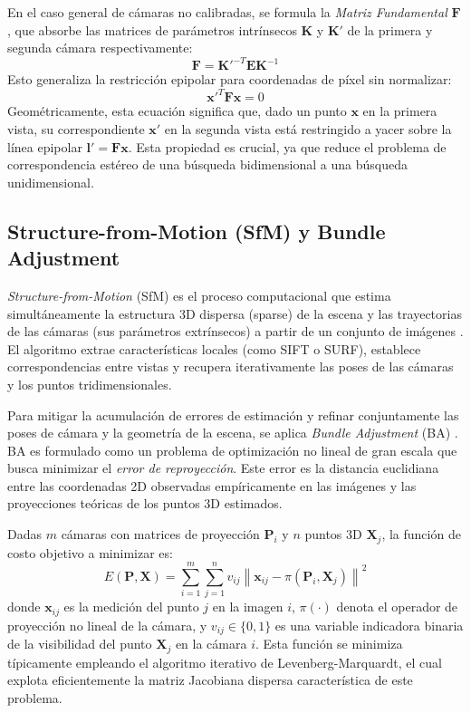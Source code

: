 En el caso general de cámaras no calibradas, se formula la \textit{Matriz Fundamental} $\mathbf{F}$, que absorbe las matrices de parámetros intrínsecos $\mathbf{K}$ y $\mathbf{K}'$ de la primera y segunda cámara respectivamente:
\begin{equation}
    \mathbf{F} = \mathbf{K}'^{-T} \mathbf{E} \mathbf{K}^{-1}
\end{equation}
Esto generaliza la restricción epipolar para coordenadas de píxel sin normalizar:
\begin{equation}
    \mathbf{x}'^T \mathbf{F} \mathbf{x} = 0
\end{equation}
Geométricamente, esta ecuación significa que, dado un punto $\mathbf{x}$ en la primera vista, su correspondiente $\mathbf{x}'$ en la segunda vista está restringido a yacer sobre la línea epipolar $\mathbf{l}' = \mathbf{F}\mathbf{x}$. Esta propiedad es crucial, ya que reduce el problema de correspondencia estéreo de una búsqueda bidimensional a una búsqueda unidimensional.

\subsection{Structure-from-Motion (SfM) y Bundle Adjustment}

\textit{Structure-from-Motion} (SfM) es el proceso computacional que estima simultáneamente la estructura 3D dispersa (sparse) de la escena y las trayectorias de las cámaras (sus parámetros extrínsecos) a partir de un conjunto de imágenes \cite{schonberger2016structure}. El algoritmo extrae características locales (como SIFT o SURF), establece correspondencias entre vistas y recupera iterativamente las poses de las cámaras y los puntos tridimensionales.

Para mitigar la acumulación de errores de estimación y refinar conjuntamente las poses de cámara y la geometría de la escena, se aplica \textit{Bundle Adjustment} (BA) \cite{triggs1999bundle}. BA es formulado como un problema de optimización no lineal de gran escala que busca minimizar el \textit{error de reproyección}. Este error es la distancia euclidiana entre las coordenadas 2D observadas empíricamente en las imágenes y las proyecciones teóricas de los puntos 3D estimados.

Dadas $m$ cámaras con matrices de proyección $\mathbf{P}_i$ y $n$ puntos 3D $\mathbf{X}_j$, la función de costo objetivo a minimizar es:
\begin{equation}
    E(\mathbf{P}, \mathbf{X}) = \sum_{i=1}^{m} \sum_{j=1}^{n} v_{ij} \left\| \mathbf{x}_{ij} - \pi(\mathbf{P}_i, \mathbf{X}_j) \right\|^2
\end{equation}
donde $\mathbf{x}_{ij}$ es la medición del punto $j$ en la imagen $i$, $\pi(\cdot)$ denota el operador de proyección no lineal de la cámara, y $v_{ij} \in \{0,1\}$ es una variable indicadora binaria de la visibilidad del punto $\mathbf{X}_j$ en la cámara $i$. Esta función se minimiza típicamente empleando el algoritmo iterativo de Levenberg-Marquardt, el cual explota eficientemente la matriz Jacobiana dispersa característica de este problema.


